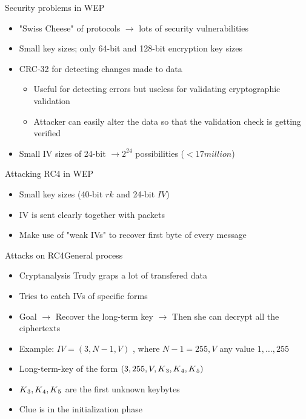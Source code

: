 \documentclass[
	aspectratio=169,	%
	onlytextwidth,		%
	t,					%
	]{beamer}
\begin{document}
\begin{frame}[fragile]{Security problems in WEP}
	\begin{itemize}
		\item "Swiss Cheese" of protocols $\rightarrow$ lots of security vulnerabilities
		\item Small key sizes; only 64-bit and 128-bit encryption key sizes
		\item CRC-32 for detecting changes made to data
		\begin{itemize}
		\item Useful for detecting errors but useless for validating cryptographic validation
		\item Attacker can easily alter the data so that the validation check is getting verified
		\end{itemize}
		\item Small IV sizes of 24-bit $\rightarrow 2^{24}$ possibilities ($<17 million$)
	\end{itemize}
\end{frame}

\begin{frame}[fragile]{Attacking RC4 in WEP}
	\begin{itemize}
		\item Small key sizes (40-bit $rk$ and 24-bit $IV$) \cite{stovsic2012rc4}
		\item IV is sent clearly together with packets
		\item Make use of "weak IVs" to recover first byte of every message
	\end{itemize}
\end{frame}

\begin{frame}[fragile]{Attacks on RC4}{General process}
	\begin{itemize}
		\item Cryptanalysis Trudy graps a lot of transfered data
		\item Tries to catch IVs of specific forms 
		\item Goal $\rightarrow$ Recover the long-term key $\rightarrow$ Then she can decrypt all the ciphertexts
		\item Example: $ IV = (3, N-1, V)$ , where $N-1 = 255, V$ any value ${1,\dots,255}$
		\item Long-term-key of the form $(3, 255, V, K\textsubscript{3}, K\textsubscript{4},K\textsubscript{5})$
		\item $K\textsubscript{3}, K\textsubscript{4},K\textsubscript{5}$ are the first unknown keybytes
		\item Clue is in the initialization phase
	\end{itemize}
\end{frame}
\end{document}
